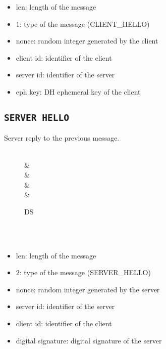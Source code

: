 \begin{itemize}
	\item len: length of the message
	\item 1: type of the message (CLIENT\_HELLO)
	\item nonce: random integer generated by the client
	\item client id: identifier of the client
	\item server id: identifier of the server
	\item eph key: DH ephemeral key of the client
\end{itemize}

\subsection{\texttt{SERVER HELLO}}
Server reply to the previous message.
\begin{figure}[h]
	\centering
	\begin{bytefield}[bitwidth=1.1em]{32}
		 \\
		&  \\
		&  \\
		&  \\
		&  \\
		\begin{rightwordgroup}{DS}
			 \\
			 \\
		\end{rightwordgroup} \\
	\end{bytefield}
\end{figure}

\begin{itemize}
	\item len: length of the message
	\item 2: type of the message (SERVER\_HELLO)
	\item nonce: random integer generated by the server
	\item server id: identifier of the server
	\item client id: identifier of the client
	\item digital signature: digital signature of the server
\end{itemize}

